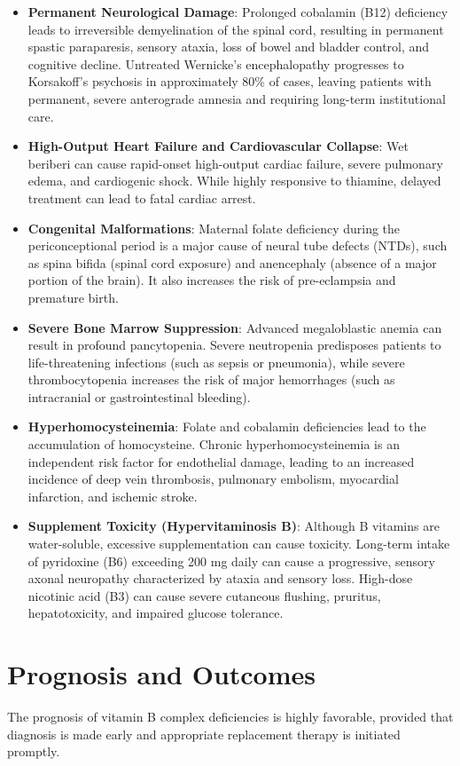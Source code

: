 \begin{itemize}
    \item \textbf{Permanent Neurological Damage}: Prolonged cobalamin (B12) deficiency leads to irreversible demyelination of the spinal cord, resulting in permanent spastic paraparesis, sensory ataxia, loss of bowel and bladder control, and cognitive decline. Untreated Wernicke's encephalopathy progresses to Korsakoff's psychosis in approximately 80\% of cases, leaving patients with permanent, severe anterograde amnesia and requiring long-term institutional care.
    \item \textbf{High-Output Heart Failure and Cardiovascular Collapse}: Wet beriberi can cause rapid-onset high-output cardiac failure, severe pulmonary edema, and cardiogenic shock. While highly responsive to thiamine, delayed treatment can lead to fatal cardiac arrest.
    \item \textbf{Congenital Malformations}: Maternal folate deficiency during the periconceptional period is a major cause of neural tube defects (NTDs), such as spina bifida (spinal cord exposure) and anencephaly (absence of a major portion of the brain). It also increases the risk of pre-eclampsia and premature birth.
    \item \textbf{Severe Bone Marrow Suppression}: Advanced megaloblastic anemia can result in profound pancytopenia. Severe neutropenia predisposes patients to life-threatening infections (such as sepsis or pneumonia), while severe thrombocytopenia increases the risk of major hemorrhages (such as intracranial or gastrointestinal bleeding).
    \item \textbf{Hyperhomocysteinemia}: Folate and cobalamin deficiencies lead to the accumulation of homocysteine. Chronic hyperhomocysteinemia is an independent risk factor for endothelial damage, leading to an increased incidence of deep vein thrombosis, pulmonary embolism, myocardial infarction, and ischemic stroke.
    \item \textbf{Supplement Toxicity (Hypervitaminosis B)}: Although B vitamins are water-soluble, excessive supplementation can cause toxicity. Long-term intake of pyridoxine (B6) exceeding 200 mg daily can cause a progressive, sensory axonal neuropathy characterized by ataxia and sensory loss. High-dose nicotinic acid (B3) can cause severe cutaneous flushing, pruritus, hepatotoxicity, and impaired glucose tolerance.
\end{itemize}

\section*{Prognosis and Outcomes}
The prognosis of vitamin B complex deficiencies is highly favorable, provided that diagnosis is made early and appropriate replacement therapy is initiated promptly.

